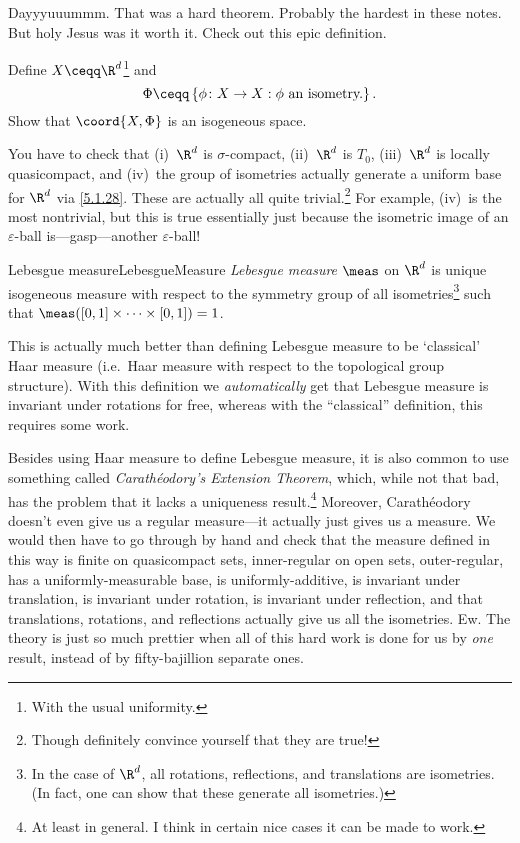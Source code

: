 Dayyyuuummm.  That was a hard theorem.  Probably the hardest in these notes.  But holy Jesus was it worth it.  Check out this epic definition.
\begin{exr}{}{}
Define $X\ceqq \R ^d$\footnote{With the usual uniformity.} and
\begin{equation}
\Phi \ceqq \left\{ \phi \colon X\rightarrow X:\phi \text{ an isometry.}\right\} .
\end{equation}
Show that $\coord{X,\Phi}$ is an isogeneous space.
\begin{rmk}
You have to check that (i)~$\R ^d$ is $\sigma$-compact, (ii)~$\R ^d$ is $T_0$, (iii)~$\R ^d$ is locally quasicompact, and (iv)~the group of isometries actually generate a uniform base for $\R ^d$ via \eqref{5.1.28}.  These are actually all quite trivial.\footnote{Though definitely convince yourself that they are true!}  For example, (iv)~is the most nontrivial, but this is true essentially just because the isometric image of an $\varepsilon$-ball is---gasp---another $\varepsilon$-ball!
\end{rmk}
\end{exr}
\begin{dfn}{Lebesgue measure}{LebesgueMeasure}
\emph{Lebesgue measure} $\meas$ on $\R ^d$ is unique isogeneous measure with respect to the symmetry group of all isometries\footnote{In the case of $\R ^d$, all rotations, reflections, and translations are isometries.  (In fact, one can show that these generate all isometries.)} such that $\meas ([0,1]\times \cdots \times [0,1])=1$.
\begin{rmk}
This is actually much better than defining Lebesgue measure to be `classical' Haar measure (i.e.~Haar measure with respect to the topological group structure).  With this definition we \emph{automatically} get that Lebesgue measure is invariant under rotations for free, whereas with the ``classical'' definition, this requires some work.
\end{rmk}
\begin{rmk}
Besides using Haar measure to define Lebesgue measure, it is also common to use something called \emph{Carathéodory's Extension Theorem}, which, while not that bad, has the problem that it lacks a uniqueness result.\footnote{At least in general.  I think in certain nice cases it can be made to work.}  Moreover, Carathéodory doesn't even give us a regular measure---it actually just gives us a measure.  We would then have to go through by hand and check that the measure defined in this way is finite on quasicompact sets, inner-regular on open sets, outer-regular, has a uniformly-measurable base, is uniformly-additive, is invariant under translation, is invariant under rotation, is invariant under reflection, and that translations, rotations, and reflections actually give us all the isometries.  Ew.  The theory is just so much prettier when all of this hard work is done for us by \emph{one} result, instead of by fifty-bajillion separate ones.
\end{rmk}
\end{dfn}


